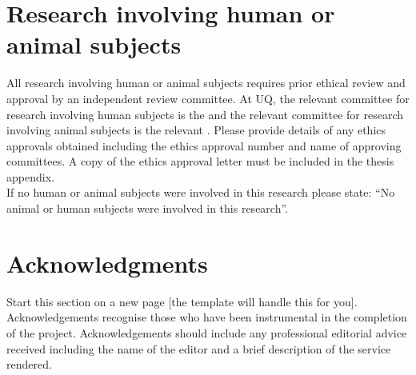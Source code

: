 



\section*{Research involving human or animal subjects}

\begin{instructional}
	All research involving human or animal subjects requires prior ethical review and approval by an independent review committee. At UQ, the relevant committee for research involving human subjects is the \href{http://www.uq.edu.au/research/integrity-compliance/human-ethics}{\color{blue}{Human Ethics Unit}} and the relevant committee for research involving animal subjects is the relevant \href{http://www.uq.edu.au/research/integrity-compliance/animal-welfare}{\color{blue}{Animal Ethics Committee}}.  Please provide details of any ethics approvals obtained including the ethics approval number and name of approving committees.  A copy of the ethics approval letter must be included in the thesis appendix.\\
    
    \noindent
	If no human or animal subjects were involved in this research please state: ``No animal or human subjects were involved in this research''.
\end{instructional}





\clearpage
\section*{Acknowledgments}

\begin{instructional}
    Start this section on a new page [the template will handle this for you].\\
    
    \noindent
    Acknowledgements recognise those who have been instrumental in the completion of the project.  Acknowledgements should include any professional editorial advice received including the name of the editor and a brief description of the service rendered.
\end{instructional}

